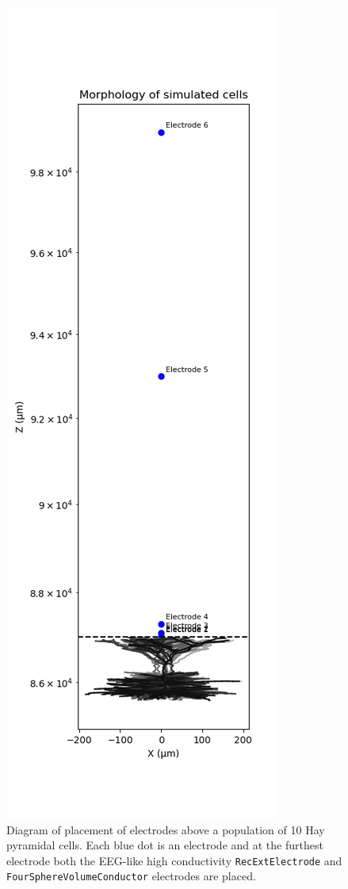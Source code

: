 \documentclass[final, a4paper,masters,en,listoffigures,listoftables,norwegiandates]{NMBU}
\begin{document}
\begin{figure}
    \centering
    \includegraphics[width=0.5\linewidth]{Figures/Elecpos.png}
    \caption{Diagram of placement of electrodes above a population of 10 Hay pyramidal cells. Each blue dot is an electrode and at the furthest electrode both the EEG-like high conductivity \texttt{RecExtElectrode} and \texttt{FourSphereVolumeConductor} electrodes are placed.}
    \label{fig:elecpos}
\end{figure}
\end{document}
